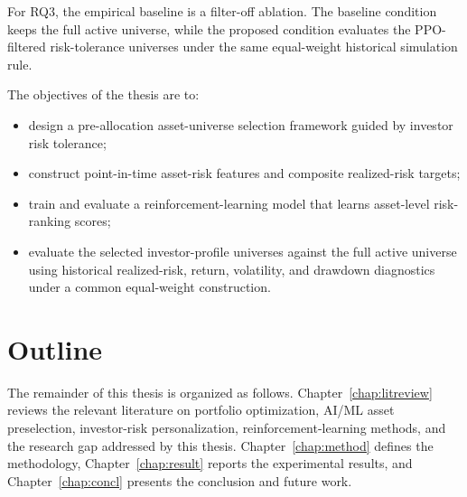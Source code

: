 For RQ3, the empirical baseline is a filter-off ablation. The baseline condition keeps the full active universe, while the proposed condition evaluates the PPO-filtered risk-tolerance universes under the same equal-weight historical simulation rule.

The objectives of the thesis are to:

\begin{itemize}
    \item design a pre-allocation asset-universe selection framework guided by investor risk tolerance;
    \item construct point-in-time asset-risk features and composite realized-risk targets;
    \item train and evaluate a reinforcement-learning model that learns asset-level risk-ranking scores;
    \item evaluate the selected investor-profile universes against the full active universe using historical realized-risk, return, volatility, and drawdown diagnostics under a common equal-weight construction.
\end{itemize}

\section{Outline}

The remainder of this thesis is organized as follows. Chapter~\ref{chap:litreview} reviews the relevant literature on portfolio optimization, AI/ML asset preselection, investor-risk personalization, reinforcement-learning methods, and the research gap addressed by this thesis. Chapter~\ref{chap:method} defines the methodology, Chapter~\ref{chap:result} reports the experimental results, and Chapter~\ref{chap:concl} presents the conclusion and future work.
